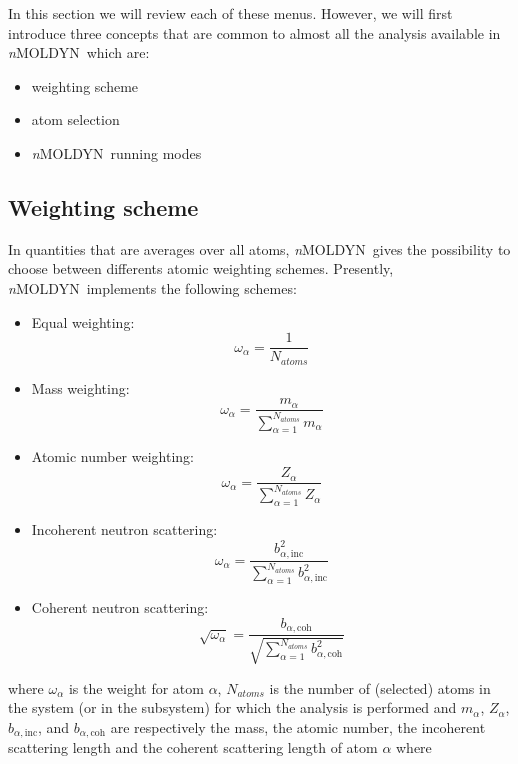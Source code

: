 \documentclass[a4paper,11pt]{report}
\newcommand{\NMOLDYN}{\textit{n}MOLDYN}
\begin{document}
In this section we will review each of these menus. However, we will first introduce three concepts that are common 
to almost all the analysis available in \NMOLDYN\ which are:
\begin{itemize}
\item weighting scheme
\item atom selection
\item \NMOLDYN\ running modes
\end{itemize}
\newpage
\subsection{Weighting scheme}
\label{weighting_scheme}
In quantities that are averages over all atoms, \NMOLDYN\ gives the possibility to choose between differents atomic weighting 
schemes. Presently, \NMOLDYN\ implements the following schemes:

\begin{itemize}
\item Equal weighting:
\begin{equation}
\label{eq:equal}
\omega_{\alpha}=\frac{1}{N_{atoms}}
\end{equation}
\item Mass weighting: 
\begin{equation}
\label{eq:mass}
\omega_{\alpha}=\frac{m_\alpha}{\sum_{\alpha=1}^{N_{atoms}} m_\alpha}
\end{equation}
\item Atomic number weighting: 
\begin{equation}
\label{eq:atomic_number}
\omega_{\alpha}=\frac{Z_\alpha}{\sum_{\alpha=1}^{N_{atoms}} Z_\alpha}
\end{equation}
\item Incoherent neutron scattering: 
\begin{equation}
\label{eq:incoherent}
\omega_{\alpha}=\frac{b_{\alpha,\mathrm{inc}}^2}{\sum_{\alpha=1}^{N_{atoms}} b_{\alpha,\mathrm{inc}}^2}
\end{equation}
\item Coherent neutron scattering: 
\begin{equation}
\label{eq:coherent}
\sqrt{\omega_{\alpha}}=\frac{b_{\alpha,\mathrm{coh}}}{\sqrt{\sum_{\alpha=1}^{N_{atoms}} b_{\alpha,\mathrm{coh}}^2}}
\end{equation}
\end{itemize}

where $\omega_\alpha$ is the weight for atom $\alpha$, $N_{atoms}$ is the number of (selected) atoms in the system (or in 
the subsystem) for which the analysis is performed and $m_\alpha$, $Z_\alpha$, $b_{\alpha,\mathrm{inc}}$, and $b_{\alpha,\mathrm{coh}}$ are respectively the 
mass, the atomic number, the incoherent scattering length and the coherent scattering length of atom $\alpha$ where
\end{document}
